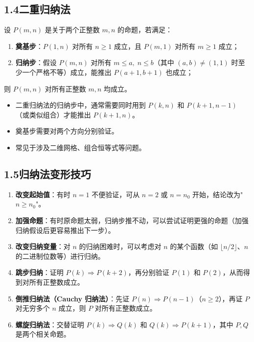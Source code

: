 \documentclass[12pt, a4paper]{ctexart}
\begin{document}
\subsection*{1.4\quad 二重归纳法}

\begin{knowledgebox}[二重归纳法原理]
设 $P(m, n)$ 是关于两个正整数 $m, n$ 的命题，若满足：
\begin{enumerate}[label=(\arabic*)]
  \item \textbf{奠基步}：$P(1, n)$ 对所有 $n \geq 1$ 成立，且 $P(m, 1)$ 对所有 $m \geq 1$ 成立；
  \item \textbf{归纳步}：假设 $P(m, n)$ 对所有 $m \leq a,\; n \leq b$（其中 $(a, b) \neq (1,1)$ 时至少一个严格不等）成立，能推出 $P(a+1, b+1)$ 也成立；
\end{enumerate}
则 $P(m, n)$ 对所有正整数 $m, n$ 均成立。
\end{knowledgebox}

\begin{warnbox}[二重归纳法注意事项]
\begin{itemize}
  \item 二重归纳法的归纳步中，通常需要同时用到 $P(k, n)$ 和 $P(k+1, n-1)$（或类似组合）才能推出 $P(k+1, n)$。
  \item 奠基步需要对两个方向分别验证。
  \item 常见于涉及二维网格、组合恒等式等问题。
\end{itemize}
\end{warnbox}

\subsection*{1.5\quad 归纳法变形技巧}

\begin{knowledgebox}[常用变形技巧]
\begin{enumerate}[label=\textbf{技巧\arabic*}]
  \item \textbf{改变起始值}：有时 $n=1$ 不便验证，可从 $n=2$ 或 $n=n_0$ 开始，结论改为"$n \geq n_0$"。
  \item \textbf{加强命题}：有时原命题太弱，归纳步推不动，可以尝试证明更强的命题（加强归纳假设后更容易推出下一步）。
  \item \textbf{改变归纳变量}：对 $n$ 的归纳困难时，可以考虑对 $n$ 的某个函数（如 $\lfloor n/2 \rfloor$、$n$ 的二进制位数等）进行归纳。
  \item \textbf{跳步归纳}：证明 $P(k) \Rightarrow P(k+2)$，再分别验证 $P(1)$ 和 $P(2)$，从而得到对所有正整数成立。
  \item \textbf{倒推归纳法（Cauchy 归纳法）}：先证 $P(n) \Rightarrow P(n-1)$（$n \geq 2$），再证 $P$ 对无穷多个 $n$ 成立，则 $P$ 对所有正整数成立。
  \item \textbf{螺旋归纳法}：交替证明 $P(k) \Rightarrow Q(k)$ 和 $Q(k) \Rightarrow P(k+1)$，其中 $P, Q$ 是两个相关命题。
\end{enumerate}
\end{knowledgebox}
\end{document}
